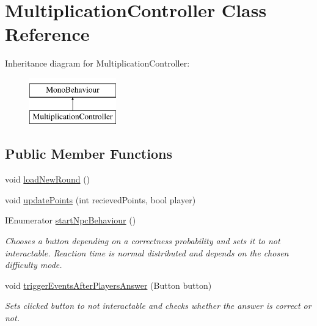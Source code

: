 \hypertarget{classMultiplicationController}{}\section{Multiplication\+Controller Class Reference}
\label{classMultiplicationController}
Inheritance diagram for Multiplication\+Controller\+:\begin{figure}[H]
\begin{center}
\leavevmode
\includegraphics[height=2.000000cm]{classMultiplicationController}
\end{center}
\end{figure}
\subsection*{Public Member Functions}
\begin{DoxyCompactItemize}
\item 
void \hyperlink{classMultiplicationController_ade300713624e2fe34010816a2eec94db}{load\+New\+Round} ()
\item 
void \hyperlink{classMultiplicationController_a521da5ae3ea1be50eaea06d7000954c8}{update\+Points} (int recieved\+Points, bool player)
\item 
I\+Enumerator \hyperlink{classMultiplicationController_ac96188fbf43771fd1f13475db8da52b5}{start\+Npc\+Behaviour} ()
\begin{DoxyCompactList}\small\item\em Chooses a button depending on a correctness probability and sets it to not interactable. Reaction time is normal distributed and depends on the chosen difficulty mode. \end{DoxyCompactList}\item 
void \hyperlink{classMultiplicationController_ab3f3d41af4f9a513943e9d7bbfa63021}{trigger\+Events\+After\+Players\+Answer} (Button button)
\begin{DoxyCompactList}\small\item\em Sets clicked button to not interactable and checks whether the answer is correct or not. \end{DoxyCompactList}\end{DoxyCompactItemize}


